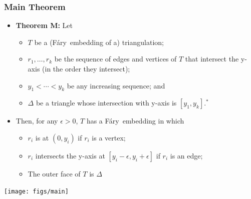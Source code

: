 \documentclass[xcolor=dvipsnames]{beamer}
\newcommand{\Fary}{F\'ary}
\begin{document}
\begin{frame}
   \frametitle{Main Theorem}
   \begin{itemize}
      \item \textbf{Theorem M:} Let
      \begin{itemize}
           \item $T$ be a (\Fary\ embedding of a) triangulation; 
           \item $r_1,\ldots,r_k$ be the sequence of edges and vertices
              of $T$ that intersect the y-axis (in the order they intersect);
           \item $y_1<\cdots<y_k$ be any increasing sequence; and
           \item $\Delta$ be a triangle whose intersection with y-axis is $[y_1,y_k]$.$^*$
      \end{itemize}
      \item Then, for any $\epsilon>0$, $T$ has a \Fary\ embedding in which 
      \begin{itemize}
          \item $r_i$ is at $(0,y_i)$ if $r_i$ is a vertex;
          \item $r_i$ intersects the y-axis at $[y_i-\epsilon,y_i+\epsilon]$ if $r_i$ is an edge;
          \item The outer face of $T$ is $\Delta$
      \end{itemize}
   \end{itemize}
   \centerline{\texttt{[image: figs/main]}}
\end{frame} 
\end{document}
